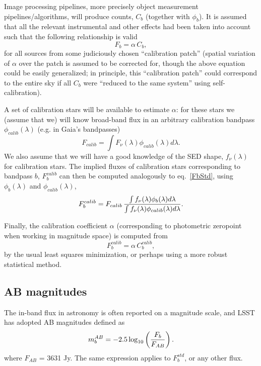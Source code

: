\documentclass{emulateapj}
\begin{document}
Image processing pipelines, more precisely object measurement pipelines/algorithms,
will produce counts, $C_b$ (together with $\phi_b$). It is assumed that all the relevant 
instrumental and other effects had been taken into account such that the following 
relationship is valid
\begin{equation} 
               F_b = \alpha \,  C_b,
\end{equation} 
for all sources from some judiciously chosen ``calibration patch'' (spatial variation of $\alpha$ over
the patch is assumed to be corrected for, though the above equation could be easily
generalized; in principle, this  ``calibration patch'' could correspond to the entire 
sky if all $C_b$ were ``reduced to the same system'' using self-calibration). 

A set of calibration stars will be available to estimate $\alpha$: for these stars 
we (assume that we) will know broad-band flux in an arbitrary calibration bandpass
$\phi_{calib}(\lambda)$ (e.g. in Gaia's bandpasses)
\begin{equation}
\label{FbCalib}
             F_{calib} = \int{F_\nu(\lambda) \phi_{calib}(\lambda) d\lambda}.
\end{equation}
We also assume that we will have a good knowledge of the SED shape,
$f_\nu(\lambda)$ for calibration stars. The implied fluxes of calibration stars corresponding 
to bandpass $b$, $F_b^{calib}$ can then be computed analogously to eq.~\ref{FbStd}, using 
$\phi_b(\lambda)$ and $\phi_{calib}(\lambda)$,
\begin{equation}
\label{FbStdCalib}
F^{calib}_b =  F_{calib} \, {\int{f_\nu(\lambda)  \phi_b(\lambda) d\lambda }  \over   \int{ f_\nu(\lambda) \phi_{calib}(\lambda) d\lambda }}. 
\end{equation}


Finally, the calibration coefficient $\alpha$ (corresponding to photometric zeropoint when
working in magnitude space) is computed from
\begin{equation} 
\label{alphaCalib}
                 F_b^{calib} = \alpha \,  C_b^{calib},
\end{equation} 
by the usual least squares minimization, or perhaps using a more robust statistical method. 


\subsection{AB magnitudes} 
The in-band flux in astronomy is often reported on a magnitude scale, and LSST has adopted
AB magnitudes defined as 
\begin{equation}
\label{ABmag}
              m^{AB}_b = -2.5\log_{10}\left({F_b \over F_{AB}}\right).
\end{equation}
where $F_{AB}$ = 3631 Jy. 
The same expression applies to $F^{std}_b$, or any other flux. 
\end{document}
